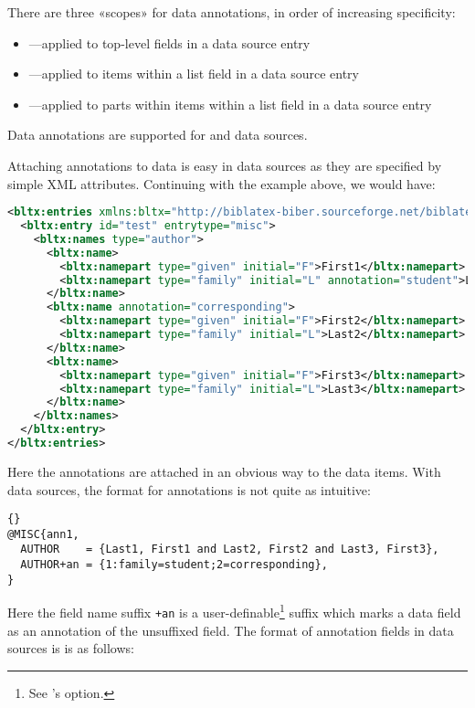\documentclass{ltxdockit}[2011/03/25]
\newcommand*{\biber}{\sty{biber}\xspace}
\newcommand*{\biblatexml}{\sty{biblatexml}\xspace}
\begin{document}
There are three «scopes» for data annotations, in order of increasing specificity:

\begin{itemize}
\item {}---applied to top-level fields in a data source entry
\item {}---applied to items within a list field in a data source entry
\item {}---applied to parts within items within a list field in a data source entry
\end{itemize}
%
Data annotations are supported for \bibtex and \biblatexml data sources.

Attaching annotations to data is easy in \biblatexml data sources as they are specified by simple XML attributes. Continuing with the example above, we would have:

\begin{lstlisting}[language=xml]
<bltx:entries xmlns:bltx="http://biblatex-biber.sourceforge.net/biblatexml">
  <bltx:entry id="test" entrytype="misc">
    <bltx:names type="author">
      <bltx:name>
        <bltx:namepart type="given" initial="F">First1</bltx:namepart>
        <bltx:namepart type="family" initial="L" annotation="student">Last1</bltx:namepart>
      </bltx:name>
      <bltx:name annotation="corresponding">
        <bltx:namepart type="given" initial="F">First2</bltx:namepart>
        <bltx:namepart type="family" initial="L">Last2</bltx:namepart>
      </bltx:name>
      <bltx:name>
        <bltx:namepart type="given" initial="F">First3</bltx:namepart>
        <bltx:namepart type="family" initial="L">Last3</bltx:namepart>
      </bltx:name>
    </bltx:names>
  </bltx:entry>
</bltx:entries>
\end{lstlisting}
%
Here the annotations are attached in an obvious way to the data items. With \bibtex data sources, the format for annotations is not quite as intuitive:

\begin{lstlisting}[style=bibtex]{}
@MISC{ann1,
  AUTHOR    = {Last1, First1 and Last2, First2 and Last3, First3},
  AUTHOR+an = {1:family=student;2=corresponding},
}
\end{lstlisting}
%
Here the field name suffix \texttt{+an} is a user-definable\footnote{See \biber's  option.} suffix which marks a data field as an annotation of the unsuffixed field. The format of annotation fields in \bibtex data sources is is as follows:
\end{document}
